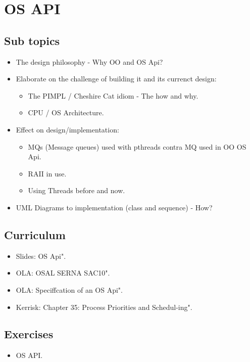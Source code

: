 \section{OS API}

\subsection{Sub topics}

\begin{itemize}
	\item The design philosophy - Why OO and OS Api?
	\item Elaborate on the challenge of building it and its currenct design:
	\begin{itemize}
		\item The PIMPL / Cheshire Cat idiom - The how and why.
		\item CPU / OS Architecture.
	\end{itemize}
	\item Effect on design/implementation:
	\begin{itemize}
		\item MQs (Message queues) used with pthreads contra MQ used in OO OS Api.
		\item RAII in use.
		\item Using Threads before and now.
	\end{itemize}
	\item UML Diagrams to implementation (class and sequence) - How?
\end{itemize}

\subsection{Curriculum}

\begin{itemize}
	\item Slides: OS Api".
	\item OLA: OSAL SERNA SAC10".
	\item OLA: Speciffcation of an OS Api".
	\item Kerrisk: Chapter 35: Process Priorities and Schedul-ing".
\end{itemize}

\subsection{Exercises}

\begin{itemize}
	\item OS API.
\end{itemize}

